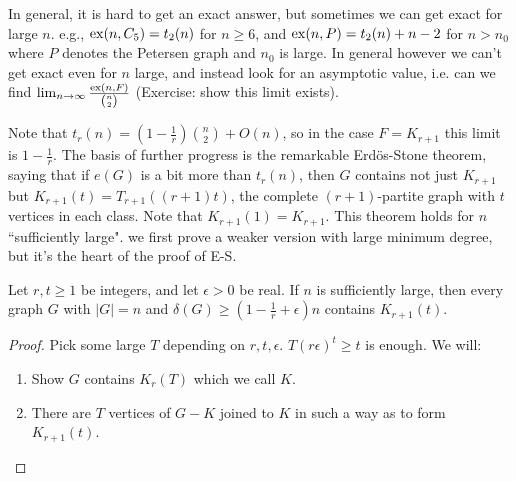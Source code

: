 \documentclass[10pt,a4paper]{article}
\begin{document}
In general, it is hard to get an exact answer, but sometimes we can get exact for large $n$. e.g., $\operatorname{ex}(n,C_5) = t_2(n)$ for $n\geq 6$, and $\operatorname{ex}(n,P) = t_2(n)+n-2$ for $n>n_0$ where $P$ denotes the Petersen graph and $n_0$ is large. In general however we can't get exact even for $n$ large, and instead look for an asymptotic value, i.e. can we find $\lim_{n\to\infty} \frac{\operatorname{ex}(n,F)}{\binom{n}{2}}$ (Exercise: show this limit exists).

Note that $t_r(n) = (1-\frac{1}{r})\binom{n}{2} + O(n)$, so in the case $F=K_{r+1}$ this limit is $1-\frac{1}{r}$. The basis of further progress is the remarkable Erd\"os-Stone theorem, saying that if $e(G)$ is a bit more than $t_r(n)$, then $G$ contains not just $K_{r+1}$ but $K_{r+1}(t) = T_{r+1}((r+1)t)$, the complete $(r+1)$-partite graph with $t$ vertices in each class. Note that $K_{r+1}(1) = K_{r+1}$. This theorem holds for $n$ ``sufficiently large". we first prove a weaker version with large minimum degree, but it's the heart of the proof of E-S.

\begin{lemma}
Let $r,t \geq 1$ be integers, and let $\epsilon >0$ be real. If $n$ is sufficiently large, then every graph $G$ with $|G|=n$ and $\delta(G) \geq (1-\frac{1}{r}+\epsilon)n$ contains $K_{r+1}(t)$.
\end{lemma}
\begin{proof}
Pick some large $T$ depending on $r, t, \epsilon$. $T(r\epsilon)^t \geq t$ is enough. We will:
\begin{enumerate}
\item Show $G$ contains $K_r(T)$ which we call $K$.
\item There are $T$ vertices of $G-K$ joined to $K$ in such a way as to form $K_{r+1}(t)$.
\end{enumerate}
\end{proof}
\end{document}
